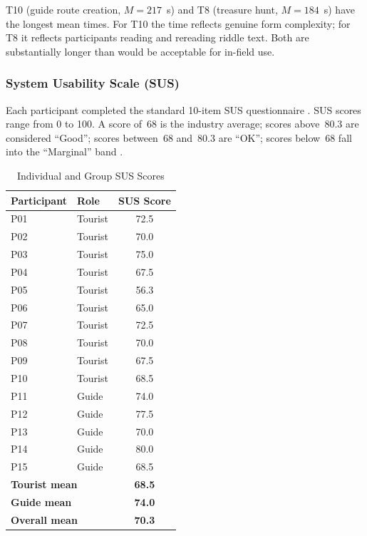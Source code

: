 T10 (guide route creation, $M = 217$~s) and T8 (treasure hunt, $M = 184$~s) have the
longest mean times. For T10 the time reflects genuine form complexity; for T8 it
reflects participants reading and rereading riddle text. Both are substantially longer
than would be acceptable for in-field use.

\subsubsection{System Usability Scale (SUS)}

Each participant completed the standard 10-item SUS questionnaire \citep{brooke1996}.
SUS scores range from 0 to 100. A score of~68 is the industry average; scores
above~80.3 are considered ``Good''; scores between~68 and~80.3 are ``OK''; scores
below~68 fall into the ``Marginal'' band \citep{bangor2008}.

\begin{table}[htbp]
  \centering
  \caption{Individual and Group SUS Scores}
  \label{tab:sus}
  \begin{tabular}{llc}
    \toprule
    \textbf{Participant} & \textbf{Role}   & \textbf{SUS Score} \\
    \midrule
    P01 & Tourist & 72.5 \\
    P02 & Tourist & 70.0 \\
    P03 & Tourist & 75.0 \\
    P04 & Tourist & 67.5 \\
    P05 & Tourist & 56.3 \\
    P06 & Tourist & 65.0 \\
    P07 & Tourist & 72.5 \\
    P08 & Tourist & 70.0 \\
    P09 & Tourist & 67.5 \\
    P10 & Tourist & 68.5 \\
    \midrule
    P11 & Guide   & 74.0 \\
    P12 & Guide   & 77.5 \\
    P13 & Guide   & 70.0 \\
    P14 & Guide   & 80.0 \\
    P15 & Guide   & 68.5 \\
    \midrule
    \multicolumn{2}{l}{\textbf{Tourist mean}} & \textbf{68.5} \\
    \multicolumn{2}{l}{\textbf{Guide mean}}   & \textbf{74.0} \\
    \multicolumn{2}{l}{\textbf{Overall mean}} & \textbf{70.3} \\
    \bottomrule
  \end{tabular}
\end{table}

